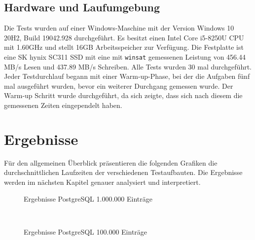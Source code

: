 






\subsection{Hardware und Laufumgebung}

Die Tests wurden auf einer Windows-Maschine mit der Version Windows 10 20H2, Build 19042.928 durchgeführt. Es besitzt einen Intel Core i5-8250U CPU mit 1.60GHz und stellt 16GB Arbeitsspeicher zur Verfügung. Die Festplatte ist eine SK hynix SC311 SSD mit eine mit \lstinline|winsat| gemessenen Leistung von 456.44 MB/s Lesen und 437.89 MB/s Schreiben.
Alle Tests wurden 30 mal durchgeführt. Jeder Testdurchlauf begann mit einer Warm-up-Phase, bei der die Aufgaben fünf mal ausgeführt wurden, bevor ein weiterer Durchgang gemessen wurde. Der Warm-up Schritt wurde durchgeführt, da sich zeigte, dass sich nach diesem die gemessenen Zeiten eingependelt haben.

\section{Ergebnisse}

Für den allgemeinen Überblick präsentieren die folgenden Grafiken die durchschnittlichen Laufzeiten der verschiedenen Testaufbauten. Die Ergebnisse werden im nächsten Kapitel genauer analysiert und interpretiert.

\begin{figure}[H]
\centering

\caption{Ergebnisse PostgreSQL 1.000.000 Einträge}
\end{figure}

\begin{figure}[H]
\centering
\\
\caption{Ergebnisse PostgreSQL 100.000 Einträge}
\end{figure}

